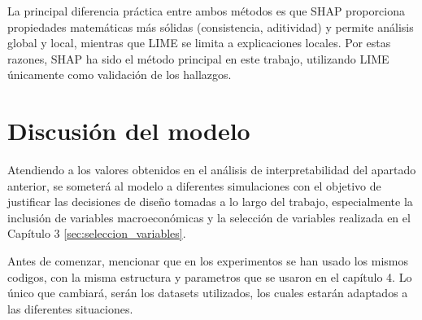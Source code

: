 La principal diferencia práctica entre ambos métodos es que SHAP proporciona propiedades matemáticas más sólidas (consistencia, aditividad) y permite análisis global y local, mientras que LIME se limita a explicaciones locales. Por estas razones, SHAP ha sido el método principal en este trabajo, utilizando LIME únicamente como validación de los hallazgos.

\section{Discusión del modelo}
Atendiendo a los valores obtenidos en el análisis de interpretabilidad del apartado anterior, se someterá al modelo a diferentes simulaciones con el objetivo de justificar las decisiones de diseño tomadas a lo largo del trabajo, especialmente la inclusión de variables macroeconómicas y la selección de variables realizada en el Capítulo 3 \ref{sec:seleccion_variables}.

Antes de comenzar, mencionar que en los experimentos se han usado los mismos codigos, con la misma estructura y parametros que se usaron en el capítulo 4. Lo único que cambiará, serán los datasets utilizados, los cuales estarán adaptados a las diferentes situaciones.


